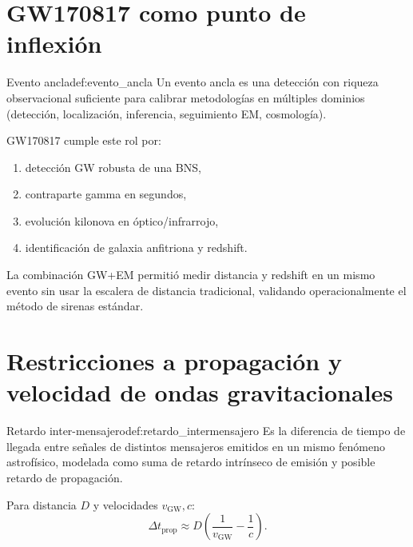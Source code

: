 \section{GW170817 como punto de inflexión}
\label{sec:gw170817_inflexion}

\begin{definicion}{Evento ancla}{def:evento_ancla}
Un evento ancla es una detección con riqueza observacional suficiente para calibrar metodologías en múltiples dominios (detección, localización, inferencia, seguimiento EM, cosmología).
\end{definicion}

GW170817 cumple este rol por:
\begin{enumerate}[leftmargin=2em, label=\textbf{\arabic*.}]
  \item detección GW robusta de una BNS,
  \item contraparte gamma en segundos,
  \item evolución kilonova en óptico/infrarrojo,
  \item identificación de galaxia anfitriona y redshift.
\end{enumerate}

\begin{importante}
La combinación GW+EM permitió medir distancia y redshift en un mismo evento sin usar la escalera de distancia tradicional, validando operacionalmente el método de sirenas estándar.
\end{importante}

\section{Restricciones a propagación y velocidad de ondas gravitacionales}
\label{sec:restricciones_propagacion}

\begin{definicion}{Retardo inter-mensajero}{def:retardo_intermensajero}
Es la diferencia de tiempo de llegada entre señales de distintos mensajeros emitidos en un mismo fenómeno astrofísico, modelada como suma de retardo intrínseco de emisión y posible retardo de propagación.
\end{definicion}

Para distancia $D$ y velocidades $v_{\mathrm{GW}},c$:
\begin{equation}
\Delta t_{\mathrm{prop}} \approx D\left(\frac{1}{v_{\mathrm{GW}}}-\frac{1}{c}\right).
\end{equation}

